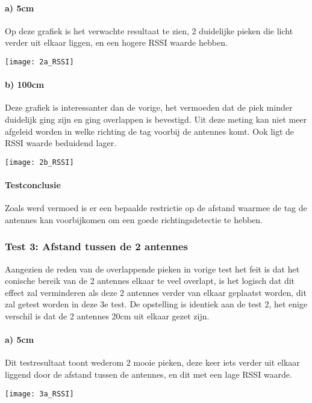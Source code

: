 \paragraph{a) 5cm}
\begin{minipage}{0.55\textwidth}
Op deze grafiek is het verwachte resultaat te zien, 2 duidelijke pieken die licht verder uit elkaar liggen, en een hogere RSSI waarde hebben.
\end{minipage}
\hfill
\begin{minipage}{0.42\textwidth}
	\texttt{[image: 2a\_RSSI]}
\end{minipage}

\paragraph{b) 100cm}
\begin{minipage}{0.55\textwidth}
Deze grafiek is interessanter dan de vorige, het vermoeden dat de piek minder duidelijk ging zijn en ging overlappen is bevestigd. Uit deze meting kan niet meer afgeleid worden in welke richting de tag voorbij de antennes komt. Ook ligt de RSSI waarde beduidend lager.
\end{minipage}
\hfill
\begin{minipage}{0.42\textwidth}
	\texttt{[image: 2b\_RSSI]}
\end{minipage}

\paragraph{Testconclusie}
Zoals werd vermoed is er een bepaalde restrictie op de afstand waarmee de tag de antennes kan voorbijkomen om een goede richtingsdetectie te hebben. 

\subsubsection{Test 3: Afstand tussen de 2 antennes}
Aangezien de reden van de overlappende pieken in vorige test het feit is dat het conische bereik van de 2 antennes elkaar te veel overlapt, is het logisch dat dit effect zal verminderen als deze 2 antennes verder van elkaar geplaatst worden, dit zal getest worden in deze 3e test. De opstelling is identiek aan de test 2, het enige verschil is dat de 2 antennes 20cm uit elkaar gezet zijn.

\paragraph{a) 5cm}
\begin{minipage}{0.55\textwidth}
Dit testresultaat toont wederom 2 mooie pieken, deze keer iets verder uit elkaar liggend door de afstand tussen de antennes, en dit met een lage RSSI waarde.
\end{minipage}
\hfill
\begin{minipage}{0.42\textwidth}
	\texttt{[image: 3a\_RSSI]}
\end{minipage}


